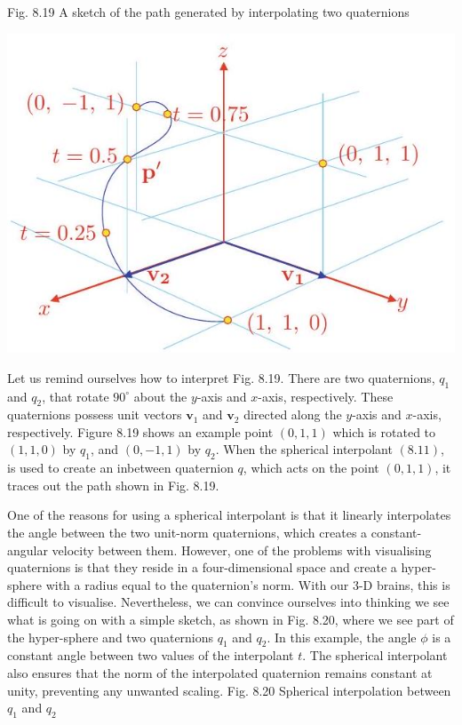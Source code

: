 \documentclass[10pt]{article}
\begin{document}
Fig. 8.19 A sketch of the path generated by interpolating two quaternions

\begin{center}
\includegraphics[max width=\textwidth]{2023_04_20_41f1ceac5a31dc7d1b59g-172}
\end{center}

Let us remind ourselves how to interpret Fig. 8.19. There are two quaternions, $q_{1}$ and $q_{2}$, that rotate $90^{\circ}$ about the $y$-axis and $x$-axis, respectively. These quaternions possess unit vectors $\mathbf{v}_{1}$ and $\mathbf{v}_{2}$ directed along the $y$-axis and $x$-axis, respectively. Figure 8.19 shows an example point $(0,1,1)$ which is rotated to $(1,1,0)$ by $q_{1}$, and $(0,-1,1)$ by $q_{2}$. When the spherical interpolant $(8.11)$, is used to create an inbetween quaternion $q$, which acts on the point $(0,1,1)$, it traces out the path shown in Fig. 8.19.

One of the reasons for using a spherical interpolant is that it linearly interpolates the angle between the two unit-norm quaternions, which creates a constant-angular velocity between them. However, one of the problems with visualising quaternions is that they reside in a four-dimensional space and create a hyper-sphere with a radius equal to the quaternion's norm. With our 3-D brains, this is difficult to visualise. Nevertheless, we can convince ourselves into thinking we see what is going on with a simple sketch, as shown in Fig. 8.20, where we see part of the hyper-sphere and two quaternions $q_{1}$ and $q_{2}$. In this example, the angle $\phi$ is a constant angle between two values of the interpolant $t$. The spherical interpolant also ensures that the norm of the interpolated quaternion remains constant at unity, preventing any unwanted scaling. Fig. 8.20 Spherical interpolation between $q_{1}$ and $q_{2}$
\end{document}
